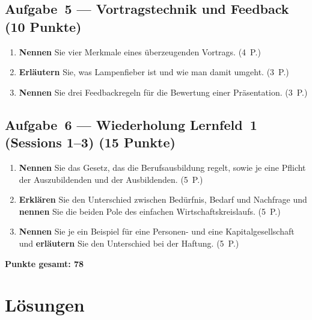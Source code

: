 \documentclass[11pt, a4paper]{article}
\begin{document}
\subsection*{Aufgabe~5 --- Vortragstechnik und Feedback (10 Punkte)}

\medskip
\begin{enumerate}[label=(\alph*)]
  \item \textbf{Nennen} Sie vier Merkmale eines überzeugenden Vortrags. \hfill (4~P.)
  \item \textbf{Erläutern} Sie, was Lampenfieber ist und wie man damit umgeht. \hfill (3~P.)
  \item \textbf{Nennen} Sie drei Feedbackregeln für die Bewertung einer Präsentation. \hfill (3~P.)
\end{enumerate}

\subsection*{Aufgabe~6 --- Wiederholung Lernfeld~1 (Sessions 1--3) (15 Punkte)}

\medskip
\begin{enumerate}[label=(\alph*)]
  \item \textbf{Nennen} Sie das Gesetz, das die Berufsausbildung regelt, sowie je eine Pflicht der Auszubildenden und der Ausbildenden. \hfill (5~P.)
  \item \textbf{Erklären} Sie den Unterschied zwischen Bedürfnis, Bedarf und Nachfrage und \textbf{nennen} Sie die beiden Pole des einfachen Wirtschaftskreislaufs. \hfill (5~P.)
  \item \textbf{Nennen} Sie je ein Beispiel für eine Personen- und eine Kapitalgesellschaft und \textbf{erläutern} Sie den Unterschied bei der Haftung. \hfill (5~P.)
\end{enumerate}

\vspace{1em}
\noindent\textbf{Punkte gesamt: 78}

\newpage

\section{Lösungen}\label{loesungen}
\end{document}
